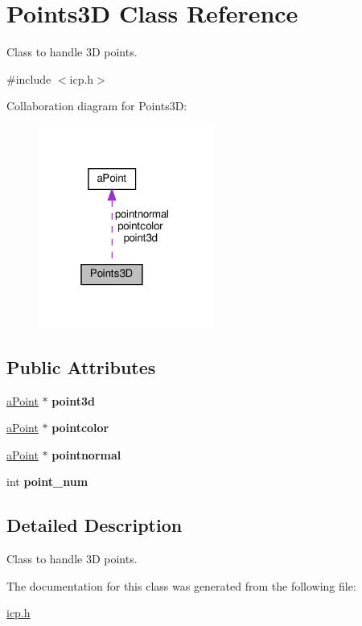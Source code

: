 \hypertarget{classPoints3D}{}\section{Points3D Class Reference}
\label{classPoints3D}


Class to handle 3D points.  




{\ttfamily \#include $<$icp.\+h$>$}



Collaboration diagram for Points3D\+:\nopagebreak
\begin{figure}[H]
\begin{center}
\leavevmode
\includegraphics[width=163pt]{classPoints3D__coll__graph}
\end{center}
\end{figure}
\subsection*{Public Attributes}
\begin{DoxyCompactItemize}
\item 
\mbox{\label{classPoints3D_ab83070a54a0f9857e76d20029c5c84f4}} 
\hyperlink{classaPoint}{a\+Point} $\ast$ {\bfseries point3d}
\item 
\mbox{\label{classPoints3D_af31fbf97956dcd4a50044942aa9b0d2f}} 
\hyperlink{classaPoint}{a\+Point} $\ast$ {\bfseries pointcolor}
\item 
\mbox{\label{classPoints3D_ad24b7ace9209a787875a7ba5d7d299e6}} 
\hyperlink{classaPoint}{a\+Point} $\ast$ {\bfseries pointnormal}
\item 
\mbox{\label{classPoints3D_a62b3884510bdabd40d1b6d70240a001f}} 
int {\bfseries point\+\_\+num}
\end{DoxyCompactItemize}


\subsection{Detailed Description}
Class to handle 3D points. 

The documentation for this class was generated from the following file\+:\begin{DoxyCompactItemize}
\item 
\hyperlink{icp_8h}{icp.\+h}\end{DoxyCompactItemize}
